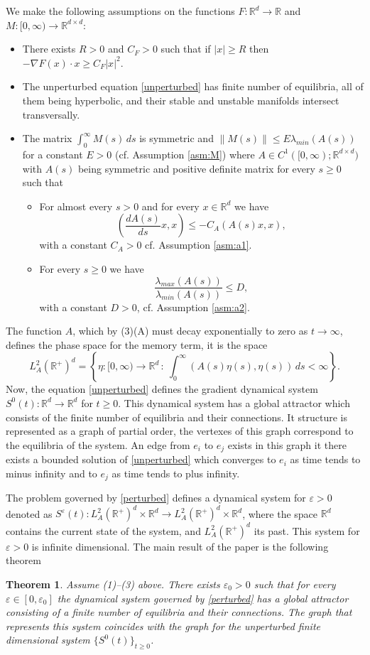 \documentclass[11pt, leqno]{amsart}
\newtheorem{thm}{Theorem}[section]
\theoremstyle{definition}
\def\R{\mathbb{R}}
\begin{document}
We make the following assumptions on the functions $F:\R^d\to \R$ and $M:[0,\infty)\to \R^{d\times d}$:
\begin{itemize}
	\item[(1)] There exists $R>0$ and $C_F>0$ such that if $|x|\geq R$ then $-\nabla F(x)\cdot x \geq C_F|x|^2$.
	\item[(2)] The unperturbed equation \eqref{unperturbed} has finite number of equilibria, all of them being hyperbolic, and their stable and unstable manifolds intersect transversally.
	\item[(3)] The matrix $\int_0^\infty M(s)\,  ds$ is symmetric and $\|M(s)\| \leq E\lambda_{min}(A(s))$ for a constant $E>0 $ (cf. Assumption \ref{asm:M}) where  $A\in C^1([0,\infty);\R^{d\times d})$ with $A(s)$ being symmetric and positive definite matrix for every $s\geq 0$ such that
	\begin{itemize}
		\item[(A)] For almost every $s>0$ and for every $x\in \R^d$ we have
		$$
		\left(\frac{dA(s)}{ds}x,x\right)\leq -C_A(A(s)x,x),
		$$
		with a constant $C_A>0$ cf. Assumption \ref{asm:a1}.
		\item[(B)] For every $s\geq 0$ we have
		$$
		\frac{\lambda_{max}(A(s))}{\lambda_{min}(A(s))}\leq D,
		$$
		with a constant $D>0$, cf. Assumption \ref{asm:a2}.
	\end{itemize}
\end{itemize}

 The function $A$, which by (3)(A) must decay exponentially to zero as $t\to \infty$, defines the phase space for the memory term, it is the space
 $$
 L^2_A(\R^+)^d = \left\{ \eta:[0,\infty)\to \R^d\, :\ \int_0^\infty (A(s)\eta(s),\eta(s))\, ds < \infty \right\}.
 $$
 Now, the equation \eqref{unperturbed} defines the gradient dynamical system $S^0(t):\R^d\to \R^d$ for $t\geq 0$. This dynamical system has a  global attractor which
 consists of the finite number of equilibria and their connections. It structure is represented as a graph of partial order, the vertexes of this graph correspond to the equilibria of the system. An edge from $e_i$ to $e_j$ exists in this graph it there exists a bounded  solution of \eqref{unperturbed} which converges to $e_i$ as time tends to minus infinity and to $e_j$ as time tends to plus infinity.

 The problem governed by \eqref{perturbed} defines a dynamical system for $\varepsilon>0$ denoted as $S^\varepsilon(t):L^2_A(\R^+)^d\times \R^d \to L^2_A(\R^+)^d\times \R^d$, where the space $\R^d$ contains the current state of the system, and  $L^2_A(\R^+)^d$ its past. This system for $\varepsilon > 0$ is infinite dimensional.
The main result of the paper is the following theorem
\begin{thm}
	Assume (1)--(3) above. There exists $\varepsilon_0>0$ such that for every $\varepsilon \in [0,\varepsilon_0]$  the dynamical system governed by \eqref{perturbed} has a global attractor consisting of a finite number of equilibria and their connections. The graph that represents this system coincides with the graph for the unperturbed finite dimensional system $\{S^0(t)\}_{t\geq 0}$.
	\end{thm}
\end{document}
